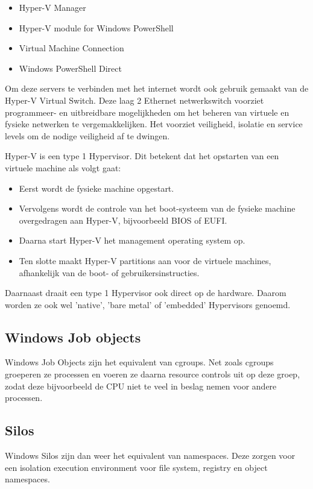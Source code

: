 \begin{itemize}[noitemsep]
	\item Hyper-V Manager
	\item Hyper-V module for Windows PowerShell
	\item Virtual Machine Connection
	\item Windows PowerShell Direct
\end{itemize}

Om deze servers te verbinden met het internet wordt ook gebruik gemaakt van de Hyper-V Virtual Switch. Deze laag 2 Ethernet netwerkswitch voorziet programmeer- en uitbreidbare mogelijkheden om het beheren van virtuele en fysieke netwerken te vergemakkelijken. Het voorziet veiligheid, isolatie en service levels om de nodige veiligheid af te dwingen. \autocite{Terry2018}

Hyper-V is een type 1 Hypervisor. Dit betekent dat het opstarten van een virtuele machine als volgt gaat:
\begin{itemize}[noitemsep]
	\item Eerst wordt de fysieke machine opgestart.
	\item Vervolgens wordt de controle van het boot-systeem van de fysieke machine overgedragen aan Hyper-V, bijvoorbeeld BIOS of EUFI.
	\item Daarna start Hyper-V het management operating system op.
	\item Ten slotte maakt Hyper-V partitions aan voor de virtuele machines, afhankelijk van de boot- of gebruikersinstructies.
\end{itemize}
Daarnaast draait een type 1 Hypervisor ook direct op de hardware. Daarom worden ze ook wel 'native', 'bare metal' of 'embedded' Hypervisors genoemd.

\subsection{Windows Job objects}
Windows Job Objects zijn het equivalent van cgroups. Net zoals cgroups groeperen ze processen en voeren ze daarna resource controls uit op deze groep, zodat deze bijvoorbeeld de CPU niet te veel in beslag nemen voor andere processen.

\subsection{Silos}
Windows Silos zijn dan weer het equivalent van namespaces. Deze zorgen voor een isolation execution environment voor file system, registry en object namespaces. \autocite{Fulton2017}

